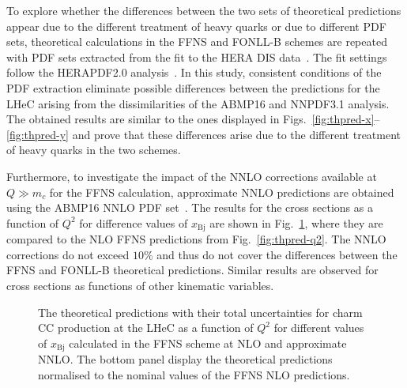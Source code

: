 \documentclass[pdftex,twocolumn,epjc3]{svjour3}          %
\newcommand{\abmp} {ABMP16\xspace}
\newcommand{\nnpdf} {NNPDF3.1\xspace}
\newcommand{\xbj}{\ensuremath{x_{\text{Bj}}}\xspace}
\newcommand{\fonll} {{FONLL-B}\xspace}
\newcommand{\ffns} {{FFNS}\xspace}
\begin{document}
To explore whether the differences between the two sets of theoretical predictions appear due to the different treatment of heavy quarks or due to different PDF sets, theoretical calculations in the \ffns and \fonll schemes are repeated with PDF sets extracted from the fit to the HERA DIS data~\cite{Abramowicz:2015mha}. The fit settings follow the HERAPDF2.0 analysis~\cite{Abramowicz:2015mha}. 
In this study, consistent conditions of the PDF extraction eliminate possible differences between the predictions for the LHeC arising from the dissimilarities of the \abmp and \nnpdf analysis. The obtained results are similar to the ones displayed in Figs.~\ref{fig:thpred-x}--\ref{fig:thpred-y} and prove that these differences arise due to the different treatment of heavy quarks in the two schemes.

Furthermore, to investigate the impact of the NNLO corrections available at $Q \gg m_c$ for the FFNS calculation, approximate NNLO predictions are obtained using the \abmp NNLO PDF set~\cite{Alekhin:2017kpj}. The results for the cross sections as a function of $Q^2$ for difference values of \xbj are shown in Fig.~\ref{fig:thpred-q2-nnlo}, where they are compared to the NLO FFNS predictions from Fig.~\ref{fig:thpred-q2}. The NNLO corrections do not exceed $10\%$ and thus do not cover the differences between the \ffns and \fonll theoretical predictions. Similar results are observed for cross sections as functions of other kinematic variables.

\begin{figure}
    \centering
    \caption{The theoretical predictions with their total uncertainties for charm CC production at the LHeC as a function of $Q^2$ for different values of \xbj calculated in the \ffns scheme at NLO and approximate NNLO. The bottom panel display the theoretical predictions normalised to the nominal values of the \ffns NLO predictions.}
    \label{fig:thpred-q2-nnlo}
\end{figure}
\end{document}

